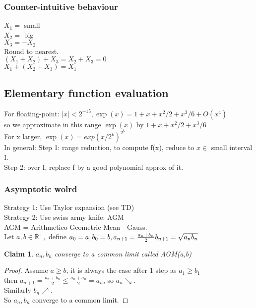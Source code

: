 \documentclass{article}
\newtheorem{claim}{Claim}
\theoremstyle{definition}
\theoremstyle{remark}
\newcommand{\R}{\mathbb{R}}
\begin{document}
	\subsubsection{Counter-intuitive behaviour}
	$X_1 =$ small\\
	$X_2 =$ big\\
	$X_3 = -X_2$\\
	Round to nearest.\\
	$(X_1 + X_2) + X_3 = X_2 + X_3 = 0$\\
	$X_1 + (X_2 + X_3) = X_1$
	
\subsection{Elementary function evaluation}

For floating-point:
$|x|< 2^{-15}, \exp(x) = 1 + x + x^2/2 + x^3/6 + O(x^4)$\\
so we approximate in this range $\exp(x)$ by $1+x+x^2/2+x^3/6$\\
For x larger, $ \exp(x) = exp(x/2^k)^{2^k} $\\

In general:
Step 1: range reduction, to compute f(x), reduce to $x \in$ small interval I.\\
Step 2: over I, replace f by a good polynomial approx of it.\\

\subsubsection{Asymptotic wolrd}
Strategy 1: Use Taylor expansion (see TD)\\
Strategy 2: Use swiss army knife: AGM\\

AGM = Arithmetico Geometric Mean - Gauss.\\
Let $a,b\in\R^+,$ define $a_0 = a, b_0 = b,\\
a_{n+1} = \frac{a_n+b_n}{2}\\
b_{n+1} = \sqrt{a_nb_n}$

\begin{claim}
	$a_n,b_n$ converge to a common limit called AGM(a,b)
\end{claim}
\begin{proof}
	Assume $a\geq b$, it is always the case after 1 step as $a_1 \geq b_1$\\
	then $a_{n+1} = \frac{a_n+b_n}{2} \leq \frac{a_n+a_n}{2} = a_n$, so $a_n\searrow$.\\
	Similarly $b_n\nearrow$.\\
	So $a_n,b_n$ converge to a common limit.
\end{proof}
\end{document}
